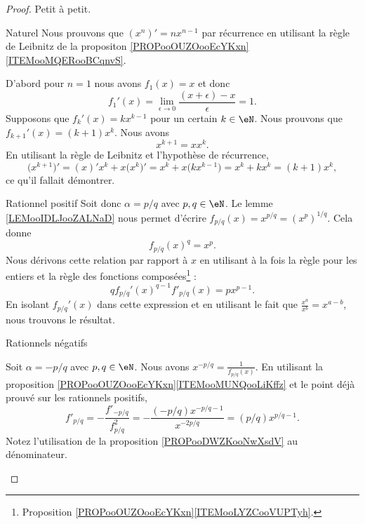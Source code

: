 \begin{proof}
    Petit à petit.
    \begin{subproof}
        \item[Naturel]
            Nous prouvons que \( (x^n)'=nx^{n-1}\) par récurrence en utilisant la règle de Leibnitz de la propositon  \ref{PROPooOUZOooEcYKxn}\ref{ITEMooMQERooBCqnvS}.

            D'abord pour \( n=1\) nous avons \( f_1(x)=x\) et donc
            \begin{equation}
                f_1'(x)=\lim_{\epsilon\to 0}\frac{ (x+\epsilon)-x }{ \epsilon }=1.
            \end{equation}
            Supposons que \( f_k'(x)=kx^{k-1}\) pour un certain \( k\in \eN\). Nous prouvons que \( f_{k+1}'(x)=(k+1)x^{k}\).  Nous avons
            \begin{equation}
                x^{k+1}=xx^k.
            \end{equation}
            En utilisant la règle de Leibnitz et l'hypothèse de récurrence,
            \begin{equation}
                    \big( x^{k+1} \big)'=(x)'x^k+x\big( x^k \big)'
                    =x^k+x\big( kx^{k-1} \big)
                    =x^k+kx^k
                    =(k+1)x^k,
            \end{equation}
            ce qu'il fallait démontrer.

        \item[Rationnel positif]
            Soit donc \( \alpha=p/q\) avec \( p,q\in \eN\). Le lemme \ref{LEMooIDLJooZALNaD} nous permet d'écrire \( f_{p/q}(x)=x^{p/q}=(x^p)^{1/q}\). Cela donne
            \begin{equation}
                f_{p/q}(x)^q=x^p.
            \end{equation}
            Nous dérivons cette relation par rapport à \( x\) en utilisant à la fois la règle pour les entiers et la règle des fonctions composées\footnote{Proposition \ref{PROPooOUZOooEcYKxn}\ref{ITEMooLYZCooVUPTyh}.} :
            \begin{equation}
                qf_{p/q}'(x)^{q-1}f'_{p/q}(x)=px^{p-1}.
            \end{equation}
            En isolant \( f_{p/q}'(x)\) dans cette expression et en utilisant le fait que \( \frac{ x^a }{ x^b }=x^{a-b}\), nous trouvons le résultat.

        \item[Rationnels négatifs]

            Soit \( \alpha=-p/q\) avec \( p,q\in \eN\). Nous avons \( x^{-p/q}=\frac{1}{ f_{p/q}(x) }\). En utilisant la proposition \ref{PROPooOUZOooEcYKxn}\ref{ITEMooMUNQooLiKffz} et le point déjà prouvé sur les rationnels positifs,
            \begin{equation}
                f'_{p/q}=-\frac{ f'_{-p/q} }{ f_{p/q}^2 }=-\frac{ (-p/q)x^{-p/q-1} }{ x^{-2p/q} }=(p/q)x^{p/q-1}.
            \end{equation}
            Notez l'utilisation de la proposition \ref{PROPooDWZKooNwXsdV} au dénominateur.


\end{subproof}
\end{proof}

